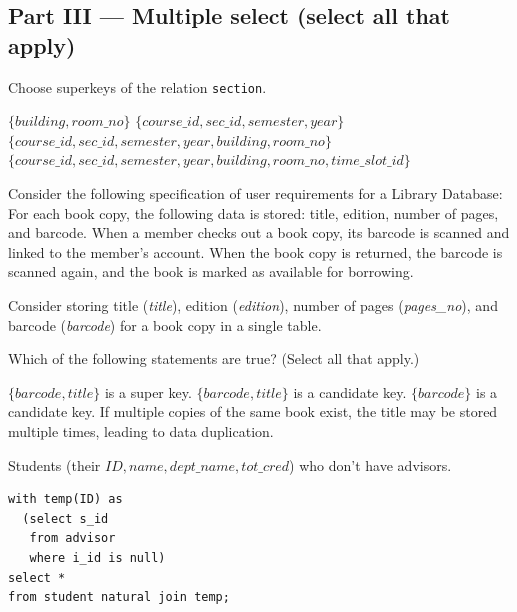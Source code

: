 \documentclass[12pt]{exam}
\begin{document}
\begin{questions}
\section*{Part III — Multiple select (select all that apply)}
\question[4] Choose superkeys of the relation \texttt{section}.
\begin{choices}
  \choice $\{\textit{building}, \textit{room\_no}\}$
  \CorrectChoice $\{\textit{course\_id}, \textit{sec\_id}, \textit{semester}, \textit{year}\}$
  \CorrectChoice $\{\textit{course\_id}, \textit{sec\_id}, \textit{semester}, \textit{year}, \textit{building}, \textit{room\_no}\}$
  \CorrectChoice $\{\textit{course\_id}, \textit{sec\_id}, \textit{semester}, \textit{year}, \textit{building}, \textit{room\_no}, \textit{time\_slot\_id}\}$
\end{choices}

\question[4] Consider the following specification of user requirements for a Library Database: For each book copy, the following data is stored: title, edition, number of pages, and barcode. When a member checks out a book copy, its barcode is scanned and linked to the member’s account. When the book copy is returned, the barcode is scanned again, and the book is marked as available for borrowing.

Consider storing title (\textit{title}), edition (\textit{edition}), number of pages (\textit{pages\_no}), and barcode (\textit{barcode}) for a book copy in a single table.

Which of the following statements are true? (Select all that apply.)

\begin{choices}
  \CorrectChoice $\{\textit{barcode}, \textit{title}\}$ is a super key.
  \choice $\{\textit{barcode}, \textit{title}\}$ is a candidate key.
  \CorrectChoice $\{\textit{barcode}\}$ is a candidate key.
  \CorrectChoice If multiple copies of the same book exist, the title may be stored multiple times, leading to data duplication.
\end{choices}

\question[6] Students (their \(\mathit{ID}, \mathit{name}, \mathit{dept\_name}, \mathit{tot\_cred}\)) who don't have advisors.
\begin{choices}

  \choice
\begin{verbatim}
with temp(ID) as
  (select s_id
   from advisor
   where i_id is null)
select *
from student natural join temp;
\end{verbatim}


\end{choices}
\end{questions}
\end{document}
